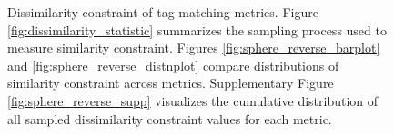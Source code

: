 \begin{figure}
\begin{center}
\caption{
Dissimilarity constraint of tag-matching metrics.
Figure \ref{fig:dissimilarity_statistic} summarizes the sampling process used to measure similarity constraint.
Figures \ref{fig:sphere_reverse_barplot} and \ref{fig:sphere_reverse_distnplot} compare distributions of similarity constraint across metrics.
Supplementary Figure \ref{fig:sphere_reverse_supp} visualizes the cumulative distribution of all sampled dissimilarity constraint values for each metric.
}
\label{fig:sphere_reverse}

\end{center}
\end{figure}
